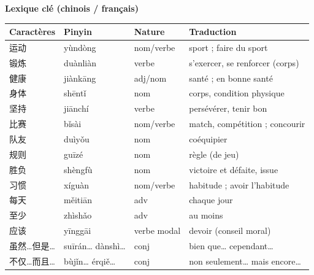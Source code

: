 \documentclass[11pt]{article}
\begin{document}
\begin{bilan}

\textbf{Lexique clé (chinois / français)} \\[4pt]
\begin{center}
\begin{tabularx}{\linewidth}{|X|X|X|X|}
\hline
\rowcolor{popblueL} \textbf{Caractères} & \textbf{Pinyin} & \textbf{Nature} & \textbf{Traduction} \\ \hline
运动 & yùndòng & nom/verbe & sport ; faire du sport \\ \hline
锻炼 & duànliàn & verbe & s'exercer, se renforcer (corps) \\ \hline
健康 & jiànkāng & adj/nom & santé ; en bonne santé \\ \hline
身体 & shēntǐ & nom & corps, condition physique \\ \hline
坚持 & jiānchí & verbe & persévérer, tenir bon \\ \hline
比赛 & bǐsài & nom/verbe & match, compétition ; concourir \\ \hline
队友 & duìyǒu & nom & coéquipier \\ \hline
规则 & guīzé & nom & règle (de jeu) \\ \hline
胜负 & shèngfù & nom & victoire et défaite, issue \\ \hline
习惯 & xíguàn & nom/verbe & habitude ; avoir l'habitude \\ \hline
每天 & měitiān & adv & chaque jour \\ \hline
至少 & zhìshǎo & adv & au moins \\ \hline
应该 & yīnggāi & verbe modal & devoir (conseil moral) \\ \hline
虽然…但是… & suīrán… dànshì… & conj & bien que… cependant… \\ \hline
不仅…而且… & bùjǐn… érqiě… & conj & non seulement… mais encore… \\ \hline
\end{tabularx}
\end{center}


\end{bilan}
\end{document}
